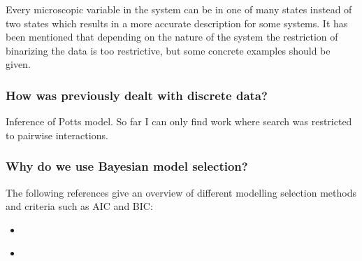 Every microscopic variable in the system can be in one of many states instead of two states which results in a more accurate description for some systems.
It has been mentioned that depending on the nature of the system the restriction of binarizing the data is too restrictive\cite{Nguyen2017}, but some concrete examples should be given.

\subsubsection*{How was previously dealt with discrete data?}

Inference of Potts model. So far I can only find work where search was restricted to pairwise interactions\cite{Barton2016}.

\subsubsection*{Why do we use Bayesian model selection?}

The following references give an overview of different modelling selection methods and criteria such as AIC and BIC:

\begin{itemize}
    \item {}\cite{Zucchini2000}
    \item {}\cite{Ding2018}
\end{itemize}

